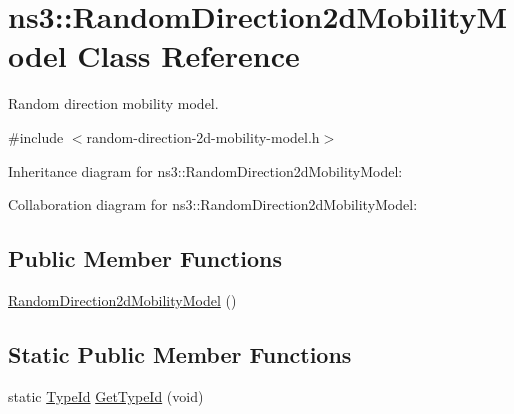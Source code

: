 \hypertarget{classns3_1_1RandomDirection2dMobilityModel}{}\section{ns3\+:\+:Random\+Direction2d\+Mobility\+Model Class Reference}
\label{classns3_1_1RandomDirection2dMobilityModel}


Random direction mobility model.  




{\ttfamily \#include $<$random-\/direction-\/2d-\/mobility-\/model.\+h$>$}



Inheritance diagram for ns3\+:\+:Random\+Direction2d\+Mobility\+Model\+:


Collaboration diagram for ns3\+:\+:Random\+Direction2d\+Mobility\+Model\+:
\subsection*{Public Member Functions}
\begin{DoxyCompactItemize}
\item 
\hyperlink{classns3_1_1RandomDirection2dMobilityModel_acdd09400e87ef90737d2399af5321cb2}{Random\+Direction2d\+Mobility\+Model} ()
\end{DoxyCompactItemize}
\subsection*{Static Public Member Functions}
\begin{DoxyCompactItemize}
\item 
static \hyperlink{classns3_1_1TypeId}{Type\+Id} \hyperlink{classns3_1_1RandomDirection2dMobilityModel_a10083abdaa3adc17057326c4dca3b77c}{Get\+Type\+Id} (void)
\end{DoxyCompactItemize}
